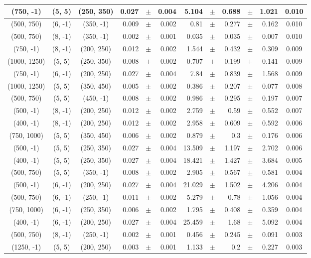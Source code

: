 \documentclass[12pt]{paper}
\begin{document}
\begin{table}[ht]
\begin{center}
{\begin{tabular}{|c|c|c|rrr|rrrrr|c|}
(750, -1)&(5, 5)&(250, 350)&0.027&$\pm$&0.004&5.104&$\pm$&0.688&$\pm$&1.021&0.010\\\hline
(500, 750)&(6, -1)&(350, -1)&0.009&$\pm$&0.002&0.81&$\pm$&0.277&$\pm$&0.162&0.010\\\hline
(500, 750)&(8, -1)&(350, -1)&0.002&$\pm$&0.001&0.035&$\pm$&0.035&$\pm$&0.007&0.010\\\hline
(750, -1)&(8, -1)&(200, 250)&0.012&$\pm$&0.002&1.544&$\pm$&0.432&$\pm$&0.309&0.009\\\hline
(1000, 1250)&(5, 5)&(250, 350)&0.008&$\pm$&0.002&0.707&$\pm$&0.199&$\pm$&0.141&0.009\\\hline
(750, -1)&(6, -1)&(200, 250)&0.027&$\pm$&0.004&7.84&$\pm$&0.839&$\pm$&1.568&0.009\\\hline
(1000, 1250)&(5, 5)&(350, 450)&0.005&$\pm$&0.002&0.386&$\pm$&0.207&$\pm$&0.077&0.008\\\hline
(500, 750)&(5, 5)&(450, -1)&0.008&$\pm$&0.002&0.986&$\pm$&0.295&$\pm$&0.197&0.007\\\hline
(500, -1)&(8, -1)&(200, 250)&0.012&$\pm$&0.002&2.759&$\pm$&0.59&$\pm$&0.552&0.007\\\hline
(400, -1)&(8, -1)&(200, 250)&0.012&$\pm$&0.002&2.958&$\pm$&0.609&$\pm$&0.592&0.006\\\hline
(750, 1000)&(5, 5)&(350, 450)&0.006&$\pm$&0.002&0.879&$\pm$&0.3&$\pm$&0.176&0.006\\\hline
(500, -1)&(5, 5)&(250, 350)&0.027&$\pm$&0.004&13.509&$\pm$&1.197&$\pm$&2.702&0.006\\\hline
(400, -1)&(5, 5)&(250, 350)&0.027&$\pm$&0.004&18.421&$\pm$&1.427&$\pm$&3.684&0.005\\\hline
(500, 750)&(5, 5)&(350, -1)&0.008&$\pm$&0.002&2.905&$\pm$&0.567&$\pm$&0.581&0.004\\\hline
(500, -1)&(6, -1)&(200, 250)&0.027&$\pm$&0.004&21.029&$\pm$&1.502&$\pm$&4.206&0.004\\\hline
(500, 750)&(6, -1)&(250, -1)&0.011&$\pm$&0.002&5.279&$\pm$&0.78&$\pm$&1.056&0.004\\\hline
(750, 1000)&(6, -1)&(250, 350)&0.006&$\pm$&0.002&1.795&$\pm$&0.408&$\pm$&0.359&0.004\\\hline
(400, -1)&(6, -1)&(200, 250)&0.027&$\pm$&0.004&25.459&$\pm$&1.68&$\pm$&5.092&0.004\\\hline
(500, 750)&(8, -1)&(250, -1)&0.002&$\pm$&0.001&0.456&$\pm$&0.245&$\pm$&0.091&0.003\\\hline
(1250, -1)&(5, 5)&(200, 250)&0.003&$\pm$&0.001&1.133&$\pm$&0.2&$\pm$&0.227&0.003\\\hline

\end{tabular}}
\end{center}
\end{table}
\end{document}
